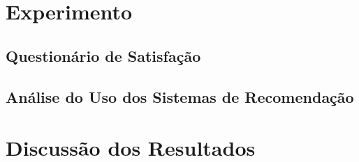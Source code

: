 \section{Experimento}\label{section:resultados-experimento}

\lipsum[1]

\subsection{Questionário de Satisfação}

\lipsum[1]

\subsection{Análise do Uso dos Sistemas de Recomendação}

\lipsum[1]

\section{Discussão dos Resultados}

\lipsum[1]